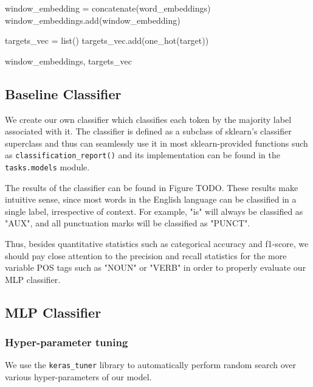 \documentclass[11pt, a4paper]{article}
\begin{document}
\begin{algorithm}
\begin{algorithmic}[1]
				\EndFor
					
				\State window\_embedding = concatenate(word\_embeddings)
				\State window\_embeddings.add(window\_embedding)
			\EndFor
			
			\State %
			
			\State targets\_vec = list()
				\State targets\_vec.add(one\_hot(target))
			\EndFor
			
			\State %
			
			\State \Return window\_embeddings, targets\_vec
			
		\end{algorithmic} 
	\end{algorithm}


	\subsection{Baseline Classifier}
	
	We create our own classifier which classifies each token by the majority label associated with it. The classifier is defined as a subclass of sklearn's classifier superclass and thus can seamlessly use it in most sklearn-provided functions such as \texttt{classification\_report()} and its implementation can be found in the \texttt{tasks.models} module.
	
	The results of the classifier can be found in Figure TODO. These results make intuitive sense, since most words in the English language can be classified in a single label, irrespective of context. For example, "is" will always be classified as "AUX", and all punctuation marks will be classified as "PUNCT".
	
	Thus, besides quantitative statistics such as categorical accuracy and f1-score, we should pay close attention to the precision and recall statistics for the more variable POS tags such as "NOUN" or "VERB" in order to properly evaluate our MLP classifier.
	

	\subsection{MLP Classifier}
	
	\subsubsection{Hyper-parameter tuning}
	
	We use the \texttt{keras\_tuner} library to automatically perform random search over various hyper-parameters of our model.
	
\end{document}
